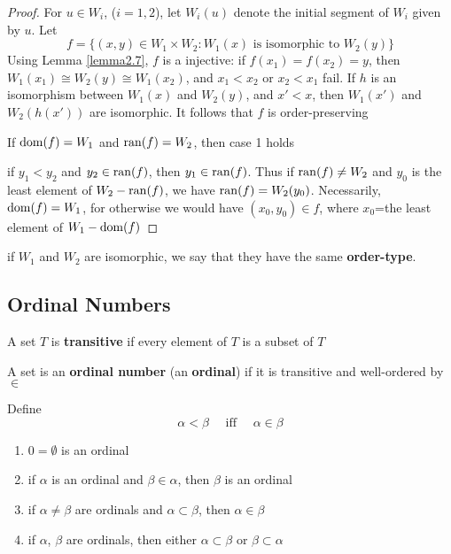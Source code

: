 \documentclass[11pt]{article}
\begin{document}
\begin{proof}
For \(u\in W_i\), (\(i=1,2\)), let \(W_i(u)\) denote the initial segment of \(W_i\) given by \(u\).
Let
\begin{equation*}
f=\{(x,y)\in W_1\times W_2:W_1(x)\text{ is isomorphic to }W_2(y)\}
\end{equation*}
Using Lemma \ref{lemma2.7}, \(f\) is a injective: if \(f(x_1)=f(x_2)=y\),
then \(W_1(x_1)\cong W_2(y)\cong W_1(x_2)\), and \(x_1<x_2\) or \(x_2<x_1\) fail. If \(h\) is an isomorphism
between \(W_1(x)\) and \(W_2(y)\), and \(x'<x\), then \(W_1(x')\) and \(W_2(h(x'))\) are isomorphic.
It follows that \(f\) is order-preserving

If \(\operatorname{dom}(f)=W_1\) and \(\operatorname{ran}(f)=W_2\), then case 1 holds

if \(y_1<y_2\) and \(y_2\in\operatorname{ran}(f)\), then \(y_1\in\operatorname{ran}(f)\). Thus if \(\operatorname{ran}(f)\neq W_2\) and \(y_0\) is the
least element of \(W_2-\operatorname{ran}(f)\), we have \(\operatorname{ran}(f)=W_2(y_0)\). Necessarily, \(\operatorname{dom}(f)=W_1\), for
otherwise we would have \((x_0,y_0)\in f\), where \(x_0\)=the least element of \(W_1-\operatorname{dom}(f)\)
\end{proof}

if \(W_1\) and \(W_2\) are isomorphic, we say that they have the same \textbf{order-type}.

\subsection{Ordinal Numbers}
\label{sec:org15c5ab6}
\begin{definition}[]
A set \(T\) is \textbf{transitive} if every element of \(T\) is a subset of \(T\)
\end{definition}

\begin{definition}[]
A set is an \textbf{ordinal number} (an \textbf{ordinal}) if it is transitive and well-ordered by \(\in\)
\end{definition}

Define
\begin{equation*}
\alpha<\beta \quad\text{ iff }\quad \alpha\in\beta
\end{equation*}

\begin{lemma}[]
\label{lemma2.11}
\begin{enumerate}
\item \(0=\emptyset\) is an ordinal
\item if \(\alpha\) is an ordinal and \(\beta\in\alpha\), then \(\beta\) is an ordinal
\item if \(\alpha\neq\beta\) are ordinals and \(\alpha\subset\beta\), then \(\alpha\in\beta\)
\item if \(\alpha\), \(\beta\) are ordinals, then either \(\alpha\subset\beta\) or \(\beta\subset\alpha\)
\end{enumerate}
\end{lemma}
\end{document}

